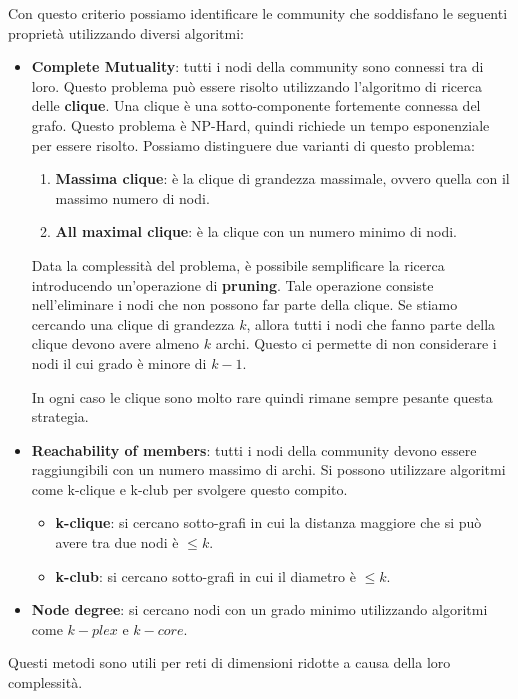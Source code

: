 Con questo criterio possiamo identificare le community che soddisfano le seguenti
proprietà utilizzando diversi algoritmi:
\begin{itemize}
    \item \textbf{Complete Mutuality}: tutti i nodi della community sono connessi
          tra di loro. Questo problema può essere risolto utilizzando l'algoritmo
          di ricerca delle \textbf{clique}. Una clique è una sotto-componente
          fortemente connessa del grafo. Questo problema è NP-Hard, quindi richiede
          un tempo esponenziale per essere risolto. Possiamo distinguere due varianti
          di questo problema:
          \begin{enumerate}
              \item \textbf{Massima clique}: è la clique di grandezza massimale,
                    ovvero quella con il massimo numero di nodi.
              \item \textbf{All maximal clique}: è la clique con un numero minimo
                    di nodi.
          \end{enumerate}
          Data la complessità del problema, è possibile semplificare la ricerca
          introducendo un'operazione di \textbf{pruning}. Tale operazione
          consiste nell'eliminare i nodi che non possono far parte della clique.
          Se stiamo cercando una clique di grandezza $k$, allora tutti i nodi che
          fanno parte della clique devono avere almeno $k$ archi. Questo ci permette
          di non considerare i nodi il cui grado è minore di $k - 1$.

          In ogni caso le clique sono molto rare quindi rimane sempre pesante
          questa strategia.
    \item \textbf{Reachability of members}: tutti i nodi della community devono
          essere raggiungibili con un numero massimo di archi. Si possono utilizzare
          algoritmi come k-clique e k-club per svolgere questo compito.
          \begin{itemize}
              \item \textbf{k-clique}: si cercano sotto-grafi in cui la distanza
                    maggiore che si può avere tra due nodi è $\leq k$.
              \item \textbf{k-club}: si cercano sotto-grafi in cui il diametro è
                    $\leq k$.
          \end{itemize}
    \item \textbf{Node degree}: si cercano nodi con un grado minimo utilizzando
          algoritmi come $k-plex$ e $k-core$.
\end{itemize}
Questi metodi sono utili per reti di dimensioni ridotte a causa della loro
complessità.

